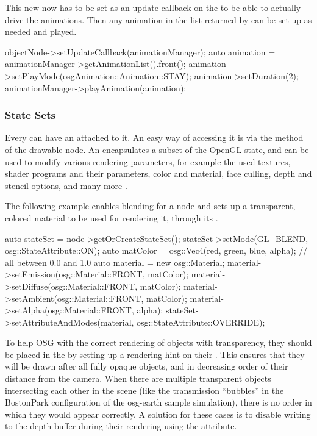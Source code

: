 This new  now has to be set as an update callback on the
 to be able to actually drive the animations.
Then any animation in the list returned by  can be set
up as needed and played.

\begin{cpp}
objectNode->setUpdateCallback(animationManager);
auto animation = animationManager->getAnimationList().front();
animation->setPlayMode(osgAnimation::Animation::STAY);
animation->setDuration(2);
animationManager->playAnimation(animation);
\end{cpp}

\subsubsection{State Sets}
\label{sec:graphics:osg-state-sets}

Every  can have an  attached to it.
An easy way of accessing it is via the  method of
the drawable node. An  encapsulates a subset of the OpenGL
state, and can be used to modify various rendering parameters, for example the
used textures, shader programs and their parameters, color and material,
face culling, depth and stencil options, and many more
.

The following example enables blending for a node and sets up a
transparent, colored material to be used for rendering it, through its
.

\begin{cpp}
auto stateSet = node->getOrCreateStateSet();
stateSet->setMode(GL_BLEND, osg::StateAttribute::ON);
auto matColor = osg::Vec4(red, green, blue, alpha); // all between 0.0 and 1.0
auto material = new osg::Material;
material->setEmission(osg::Material::FRONT, matColor);
material->setDiffuse(osg::Material::FRONT, matColor);
material->setAmbient(osg::Material::FRONT, matColor);
material->setAlpha(osg::Material::FRONT, alpha);
stateSet->setAttributeAndModes(material, osg::StateAttribute::OVERRIDE);
\end{cpp}

To help OSG with the correct rendering of objects with transparency, they
should be placed in the  by setting up a rendering hint
on their . This ensures that they will be drawn after all
fully opaque objects, and in decreasing order of their distance from the camera.
When there are multiple transparent objects intersecting each other in the scene
(like the transmission ``bubbles'' in the BostonPark configuration of the
osg-earth sample simulation), there is no order in which they would appear correctly. A
solution for these cases is to disable writing to the depth buffer during their
rendering using the  attribute.

